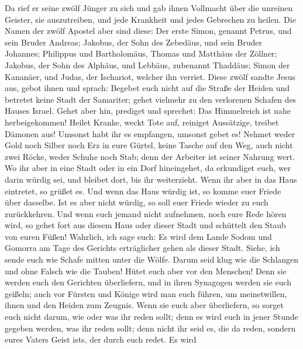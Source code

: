  Da rief er seine zwölf Jünger zu sich und gab ihnen
Vollmacht über die unreinen Geister, sie auszutreiben, und jede
Krankheit und jedes Gebrechen zu heilen.  Die Namen der
zwölf Apostel aber sind diese: Der erste Simon, genannt Petrus, und sein
Bruder Andreas; Jakobus, der Sohn des Zebedäus, und sein Bruder
Johannes;  Philippus und Bartholomäus, Thomas und Matthäus
der Zöllner; Jakobus, der Sohn des Alphäus, und Lebbäus, zubenannt
Thaddäus;  Simon der Kananäer, und Judas, der Ischariot,
welcher ihn verriet.  Diese zwölf sandte Jesus aus, gebot
ihnen und sprach: Begebet euch nicht auf die Straße der Heiden und
betretet keine Stadt der Samariter;  gehet vielmehr zu den
verlorenen Schafen des Hauses Israel.  Gehet aber hin,
prediget und sprechet: Das Himmelreich ist nahe herbeigekommen!
 Heilet Kranke, weckt Tote auf, reiniget Aussätzige,
treibet Dämonen aus! Umsonst habt ihr es empfangen, umsonst gebet es!
 Nehmet weder Gold noch Silber noch Erz in eure Gürtel,
 keine Tasche auf den Weg, auch nicht zwei Röcke, weder
Schuhe noch Stab; denn der Arbeiter ist seiner Nahrung wert.
 Wo ihr aber in eine Stadt oder in ein Dorf hineingehet,
da erkundiget euch, wer darin würdig sei, und bleibet dort, bis ihr
weiterzieht.  Wenn ihr aber in das Haus eintretet, so
grüßet es.  Und wenn das Haus würdig ist, so komme euer
Friede über dasselbe. Ist es aber nicht würdig, so soll euer Friede
wieder zu euch zurückkehren.  Und wenn euch jemand nicht
aufnehmen, noch eure Rede hören wird, so gehet fort aus diesem Haus oder
dieser Stadt und schüttelt den Staub von euren Füßen! 
Wahrlich, ich sage euch: Es wird dem Lande Sodom und Gomorra am Tage des
Gerichts erträglicher gehen als dieser Stadt.  Siehe, ich
sende euch wie Schafe mitten unter die Wölfe. Darum seid klug wie die
Schlangen und ohne Falsch wie die Tauben!  Hütet euch
aber vor den Menschen! Denn sie werden euch den Gerichten überliefern,
und in ihren Synagogen werden sie euch geißeln;  auch vor
Fürsten und Könige wird man euch führen, um meinetwillen, ihnen und den
Heiden zum Zeugnis.  Wenn sie euch aber überliefern, so
sorget euch nicht darum, wie oder was ihr reden sollt; denn es wird euch
in jener Stunde gegeben werden, was ihr reden sollt; 
denn nicht ihr seid es, die da reden, sondern eures Vaters Geist
ist\textquotesingle s, der durch euch redet.  Es wird
